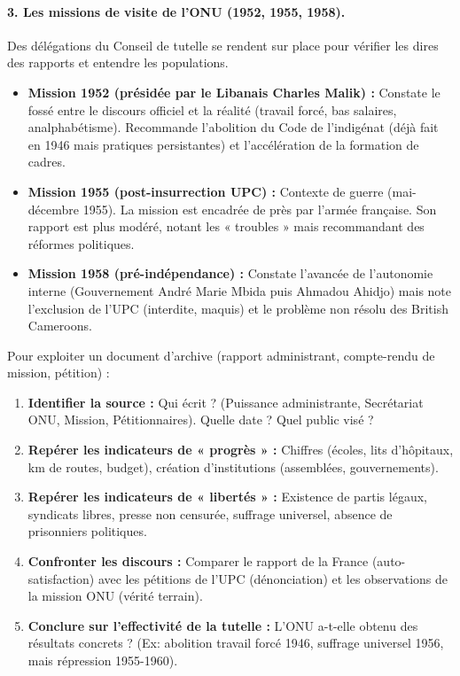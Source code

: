 \documentclass[11pt]{article}
\begin{document}
\paragraph{3. Les missions de visite de l'ONU (1952, 1955, 1958).}
Des délégations du Conseil de tutelle se rendent sur place pour vérifier les dires des rapports et entendre les populations.
\begin{itemize}
    \item \textbf{Mission 1952 (présidée par le Libanais Charles Malik) :} Constate le fossé entre le discours officiel et la réalité (travail forcé, bas salaires, analphabétisme). Recommande l'abolition du Code de l'indigénat (déjà fait en 1946 mais pratiques persistantes) et l'accélération de la formation de cadres.
    \item \textbf{Mission 1955 (post-insurrection UPC) :} Contexte de guerre (mai-décembre 1955). La mission est encadrée de près par l'armée française. Son rapport est plus modéré, notant les « troubles » mais recommandant des réformes politiques.
    \item \textbf{Mission 1958 (pré-indépendance) :} Constate l'avancée de l'autonomie interne (Gouvernement André Marie Mbida puis Ahmadou Ahidjo) mais note l'exclusion de l'UPC (interdite, maquis) et le problème non résolu des British Cameroons.
\end{itemize}

\begin{methode}
Pour exploiter un document d'archive (rapport administrant, compte-rendu de mission, pétition) :
\begin{enumerate}
    \item \textbf{Identifier la source :} Qui écrit ? (Puissance administrante, Secrétariat ONU, Mission, Pétitionnaires). Quelle date ? Quel public visé ?
    \item \textbf{Repérer les indicateurs de « progrès » :} Chiffres (écoles, lits d'hôpitaux, km de routes, budget), création d'institutions (assemblées, gouvernements).
    \item \textbf{Repérer les indicateurs de « libertés » :} Existence de partis légaux, syndicats libres, presse non censurée, suffrage universel, absence de prisonniers politiques.
    \item \textbf{Confronter les discours :} Comparer le rapport de la France (auto-satisfaction) avec les pétitions de l'UPC (dénonciation) et les observations de la mission ONU (vérité terrain).
    \item \textbf{Conclure sur l'effectivité de la tutelle :} L'ONU a-t-elle obtenu des résultats concrets ? (Ex: abolition travail forcé 1946, suffrage universel 1956, mais répression 1955-1960).
\end{enumerate}
\end{methode}
\end{document}
